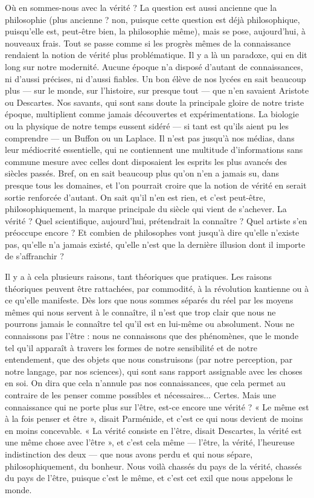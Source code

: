 Où en sommes-nous avec la vérité ? La question est aussi ancienne que la
philosophie (plus ancienne ? non, puisque cette question est déjà philosophique,
puisqu'elle est, peut-être bien, la philosophie même), mais se pose,
aujourd’hui, à nouveaux frais. Tout se passe comme si les progrès mêmes de
la connaissance rendaient la notion de vérité plus problématique. Il y a là un
paradoxe, qui en dit long sur notre modernité. Aucune époque n’a disposé
d'autant de connaissances, ni d’aussi précises, ni d’aussi fiables. Un bon élève
de nos lycées en sait beaucoup plus — sur le monde, sur l’histoire, sur presque
tout — que n'en savaient Aristote ou Descartes. Nos savants, qui sont sans
doute la principale gloire de notre triste époque, multiplient comme jamais
découvertes et expérimentations. La biologie ou la physique de notre temps
eussent sidéré — si tant est qu’ils aient pu les comprendre — un Buffon ou un
Laplace. Il n’est pas jusqu’à nos médias, dans leur médiocrité essentielle, qui
ne contiennent une multitude d’informations sans commune mesure avec
celles dont disposaient les esprits les plus avancés des siècles passés. Bref, on
en sait beaucoup plus qu’on n’en a jamais su, dans presque tous les domaines,
et l’on pourrait croire que la notion de vérité en serait sortie renforcée
d'autant. On sait qu’il n’en est rien, et c’est peut-être, philosophiquement, la
marque principale du siècle qui vient de s'achever. La vérité ? Quel scientifique,
aujourd’hui, prétendrait la connaître ? Quel artiste s’en préoccupe
encore ? Et combien de philosophes vont jusqu’à dire qu’elle n’existe pas,
qu’elle n’a jamais existé, qu’elle n’est que la dernière illusion dont il importe
de s’affranchir ?

Il y a à cela plusieurs raisons, tant théoriques que pratiques. Les raisons
théoriques peuvent être rattachées, par commodité, à la révolution kantienne
ou à ce qu'elle manifeste. Dès lors que nous sommes séparés du réel par les
moyens mêmes qui nous servent à le connaître, il n’est que trop clair que nous
ne pourrons jamais le connaître tel qu’il est en lui-même ou absolument. Nous
ne connaissons pas l’être : nous ne connaissons que des phénomènes, que le
monde tel qu’il apparaît à travers les formes de notre sensibilité et de notre
entendement, que des objets que nous construisons (par notre perception, par
notre langage, par nos sciences), qui sont sans rapport assignable avec les choses
en soi. On dira que cela n’annule pas nos connaissances, que cela permet au
contraire de les penser comme possibles et nécessaires... Certes. Mais une
connaissance qui ne porte plus sur l’être, est-ce encore une vérité ? « Le même
est à la fois penser et être », disait Parménide, et c’est ce qui nous devient de
moins en moins concevable. « La vérité consiste en l’être, disait Descartes, la
vérité est une même chose avec l’être », et c’est cela même — l’être, la vérité,
l’heureuse indistinction des deux — que nous avons perdu et qui nous sépare,
philosophiquement, du bonheur. Nous voilà chassés du pays de la vérité,
chassés du pays de l'être, puisque c’est le même, et c’est cet exil que nous appelons
le monde.

